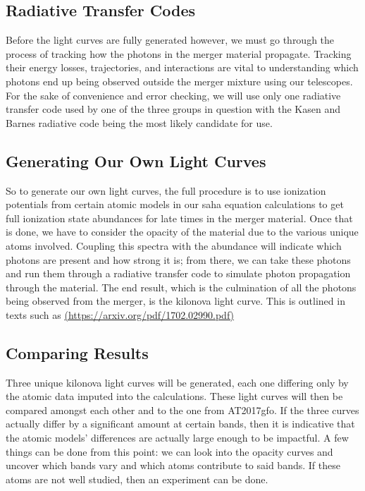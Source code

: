 \documentclass[11pt,a4paper]{article}
\begin{document}
\subsection{Radiative Transfer Codes}

Before the light curves are fully generated however, we must go through the process of tracking how the photons in the merger material propagate. Tracking their energy losses, trajectories, and interactions are vital to understanding which photons end up being observed outside the merger mixture using our telescopes. For the sake of convenience and error checking, we will use only one radiative transfer code used by one of the three groups in question with the Kasen and Barnes radiative code being the most likely candidate for use. 

\subsection{Generating Our Own Light Curves}

So to generate our own light curves, the full procedure is to use ionization potentials from certain atomic models in our saha equation calculations to get full ionization state abundances for late times in the merger material. Once that is done, we have to consider the opacity of the material due to the various unique atoms involved. Coupling this spectra with the abundance will indicate which photons are present and how strong it is; from there, we can take these photons and run them through a radiative transfer code to simulate photon propagation through the material. The end result, which is the culmination of all the photons being observed from the merger, is the kilonova light curve.
This is outlined in texts such as \url{(https://arxiv.org/pdf/1702.02990.pdf)}

\subsection{Comparing Results}

Three unique kilonova light curves will be generated, each one differing only by the atomic data imputed into the calculations. These light curves will then be compared amongst each other and to the one from AT2017gfo. If the three curves actually differ by a significant amount at certain bands, then it is indicative that the atomic models’ differences are actually large enough to be impactful. A few things can be done from this point: we can look into the opacity curves and uncover which bands vary and which atoms contribute to said bands. If these atoms are not well studied, then an experiment can be done.
\end{document}
